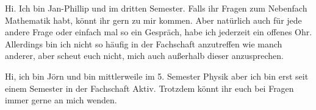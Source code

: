 \begin{multicols*}{2}
{Hi. Ich bin Jan-Phillip und im dritten Semester.
	Falls ihr Fragen zum Nebenfach Mathematik habt, könnt ihr gern zu mir kommen. Aber natürlich auch für jede andere Frage oder einfach mal so ein Gespräch, habe ich jederzeit ein offenes Ohr. Allerdings bin ich nicht so häufig in der Fachschaft anzutreffen wie manch anderer, aber scheut euch nicht, mich auch außerhalb dieser anzusprechen. 
	\vspace{\baselineskip}}

{Hi, ich bin Jörn und bin mittlerweile im 5. Semester Physik
	aber ich bin erst seit einem Semester in der Fachschaft Aktiv.
	Trotzdem könnt ihr euch bei Fragen immer gerne an mich wenden.}


\end{multicols*}
